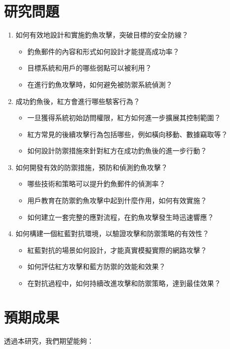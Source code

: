 \documentclass[a4paper,12pt]{article}
\begin{document}
\section{研究問題}
\begin{enumerate}
  \item 如何有效地設計和實施釣魚攻擊，突破目標的安全防線？
    \begin{itemize}
      \item 釣魚郵件的內容和形式如何設計才能提高成功率？
      \item 目標系統和用戶的哪些弱點可以被利用？
      \item 在進行釣魚攻擊時，如何避免被防禦系統偵測？
    \end{itemize}
  \item 成功釣魚後，紅方會進行哪些駭客行為？
    \begin{itemize}
      \item 一旦獲得系統初始訪問權限，紅方如何進一步擴展其控制範圍？
      \item 紅方常見的後續攻擊行為包括哪些，例如橫向移動、數據竊取等？
      \item 如何設計防禦措施來針對紅方在成功釣魚後的進一步行動？
    \end{itemize}
  \item 如何開發有效的防禦措施，預防和偵測釣魚攻擊？
    \begin{itemize}
      \item 哪些技術和策略可以提升釣魚郵件的偵測率？
      \item 用戶教育在防禦釣魚攻擊中起到什麼作用，如何有效實施？
      \item 如何建立一套完整的應對流程，在釣魚攻擊發生時迅速響應？
    \end{itemize}
  \item 如何構建一個紅藍對抗環境，以驗證攻擊和防禦策略的有效性？
    \begin{itemize}
      \item 紅藍對抗的場景如何設計，才能真實模擬實際的網路攻擊？
      \item 如何評估紅方攻擊和藍方防禦的效能和效果？
      \item 在對抗過程中，如何持續改進攻擊和防禦策略，達到最佳效果？
    \end{itemize}
\end{enumerate}

\section{預期成果}
透過本研究，我們期望能夠：
\end{document}
